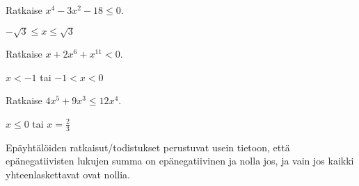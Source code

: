 \begin{tehtavasivu}
\begin{tehtava}
    Ratkaise $x^4-3x^2-18 \le 0$.
    \begin{vastaus}
        $-\sqrt{3}\le x \le \sqrt{3}$
    \end{vastaus}
\end{tehtava}

\begin{tehtava}
    Ratkaise $x+2x^6+x^{11}<0$.
    \begin{vastaus}
        $x<-1$ tai $ -1<x<0$
    \end{vastaus}
\end{tehtava}

\begin{tehtava}
    Ratkaise $4 x^5+9 x^3 \le 12 x^4$.
    \begin{vastaus}
        $x\le0$ tai $x=\frac{2}{3}$
    \end{vastaus}
\end{tehtava}

\begin{tehtava}
Epäyhtälöiden ratkaisut/todistukset perustuvat usein tietoon, että epänegatiivisten lukujen summa on epänegatiivinen ja nolla jos, ja vain jos kaikki yhteenlaskettavat ovat nollia.

\begin{alakohdat}
\end{alakohdat}

\begin{vastaus}
\begin{alakohdat}
\end{alakohdat}
\end{vastaus}
\end{tehtava}

\end{tehtavasivu}
